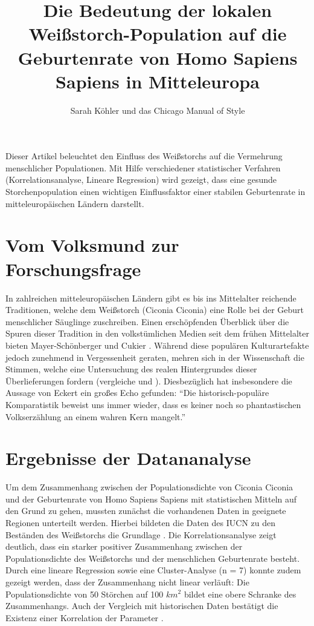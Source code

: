 \documentclass{article}
\title{Die Bedeutung der lokalen Weißstorch-Population auf die Geburtenrate von Homo Sapiens Sapiens in Mitteleuropa}
\author{Sarah Köhler und das Chicago Manual of Style}
\begin{document}
\maketitle
\abstract
Dieser Artikel beleuchtet den Einfluss des Weißstorchs auf die Vermehrung
menschlicher Populationen.
Mit Hilfe verschiedener statistischer Verfahren (Korrelationsanalyse, Lineare Regression)
wird gezeigt, dass eine gesunde Storchenpopulation einen wichtigen Einflussfaktor
einer stabilen Geburtenrate in mitteleuropäischen Ländern darstellt.

\section{Vom Volksmund zur Forschungsfrage}
In zahlreichen mitteleuropäischen Ländern gibt es bis ins Mittelalter reichende Traditionen,
welche dem Weißstorch (Ciconia Ciconia) eine Rolle bei der Geburt menschlicher Säuglinge zuschreiben.
Einen erschöpfenden Überblick über die Spuren dieser Tradition in den volkstümlichen Medien
seit dem frühen Mittelalter bieten Mayer-Schönberger und Cukier \autocite[12]{mayer-schonberger_big_2013}.
Während diese populären Kulturartefakte jedoch zunehmend in Vergessenheit geraten,
mehren sich in der Wissenschaft die Stimmen, welche eine Untersuchung des realen Hintergrundes
dieser Überlieferungen fordern (vergleiche \cite[34]{orwat_software_2009} und \cite[167]{fleissner_heilung_2006}).
Diesbezüglich hat insbesondere die Aussage von Eckert ein großes Echo gefunden:
"`Die historisch-populäre Komparatistik beweist uns immer wieder,
dass es keiner noch so phantastischen Volkserzählung an einem wahren Kern mangelt."'\autocite[456]{eckert_mobil_2003}

\section{Ergebnisse der Datananalyse}

Um dem Zusammenhang zwischen der Populationsdichte von Ciconia Ciconia und der Geburtenrate von Homo Sapiens Sapiens mit statistischen Mitteln auf den Grund zu gehen, mussten zunächst die vorhandenen Daten in geeignete Regionen unterteilt werden.
Hierbei bildeten die Daten des IUCN zu den Beständen des Weißstorchs die Grundlage \autocite[76]{whitman_two_2004}.
Die Korrelationsanalyse zeigt deutlich, dass ein starker positiver Zusammenhang zwischen der Populationsdichte des Weißstorchs und der menschlichen Geburtenrate besteht.
Durch eine lineare Regression sowie eine Cluster-Analyse (n = 7) konnte zudem gezeigt werden, dass der Zusammenhang nicht linear verläuft: Die Populationsdichte von 50 Störchen auf 100 $km^2$ bildet eine obere Schranke des Zusammenhangs.
Auch der Vergleich mit historischen Daten bestätigt die Existenz einer Korrelation der Parameter \autocite[5-13]{coudert_when_2010}.
\end{document}
